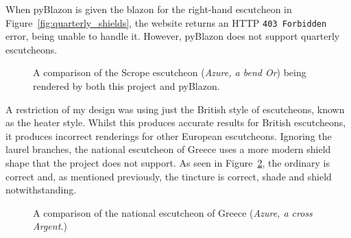 \documentclass[nobib, a4paper, twoside, justified]{tufte-book}
\makeatletter
\newcommand{\blazon}{\gls{blazon}\@\xspace}
\makeatother
\begin{document}
When pyBlazon is given the \blazon for the right-hand \gls{escutcheon} in
Figure~\ref{fig:quarterly_shields}, the website returns an HTTP \texttt{403 Forbidden} error, being
unable to handle it. However, pyBlazon does not support quarterly \glspl{escutcheon}.

\begin{figure}[h!]
  \centering
  \qquad
  \caption{A comparison of the Scrope \gls{escutcheon} (\textit{Azure, a bend Or}) being rendered
  by both this project and pyBlazon.}%
  \label{fig:pyblazon_scrope_comparison}
\end{figure}

A restriction of my design was using just the British style of \glspl{escutcheon}, known as the
heater style. Whilst this produces accurate results for British \glspl{escutcheon}, it produces
incorrect renderings for other European \glspl{escutcheon}. Ignoring the laurel branches, the
national \gls{escutcheon} of Greece uses a more modern shield shape that the project does not
support. As seen in Figure~\ref{fig:greek_coa}, the \gls{ordinary} is correct and, as mentioned
previously, the tincture is correct, shade and shield notwithstanding.

\begin{figure}[h]
  \centering
  \qquad
  \caption{A comparison of the national \gls{escutcheon} of Greece (\textit{Azure, a cross
  Argent.})}%
  \label{fig:greek_coa}
\end{figure}
\end{document}
